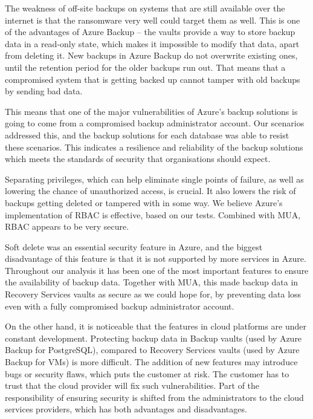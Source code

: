 The weakness of off-site backups on systems that are still available over the internet is that the ransomware very well could target them as well. This is one of the advantages of Azure Backup -- the vaults provide a way to store backup data in a read-only state, which makes it impossible to modify that data, apart from deleting it. New backups in Azure Backup do not overwrite existing ones, until the retention period for the older backups run out. That means that a compromised system that is getting backed up cannot tamper with old backups by sending bad data. 

This means that one of the major vulnerabilities of Azure's backup solutions is going to come from a compromised backup administrator account. Our scenarios addressed this, and the backup solutions for each database was able to resist these scenarios. This indicates a resilience and reliability of the backup solutions which meets the standards of security that organisations should expect. 

Separating privileges, which can help eliminate single points of failure, as well as lowering the chance of unauthorized access, is crucial. It also lowers the risk of backups getting deleted or tampered with in some way. We believe Azure's implementation of RBAC is effective, based on our tests. Combined with MUA, RBAC appears to be very secure. 

Soft delete was an essential security feature in Azure, and the biggest disadvantage of this feature is that it is not supported by more services in Azure. Throughout our analysis it has been one of the most important features to ensure the availability of backup data. Together with MUA, this made backup data in Recovery Services vaults as secure as we could hope for, by preventing data loss even with a fully compromised backup administrator account. 

On the other hand, it is noticeable that the features in cloud platforms are under constant development. Protecting backup data in Backup vaults (used by Azure Backup for PostgreSQL), compared to Recovery Services vaults (used by Azure Backup for VMs) is more difficult. The addition of new features may introduce bugs or security flaws, which puts the customer at risk. The customer has to trust that the cloud provider will fix such vulnerabilities. Part of the responsibility of ensuring security is shifted from the administrators to the cloud services providers, which has both advantages and disadvantages.

